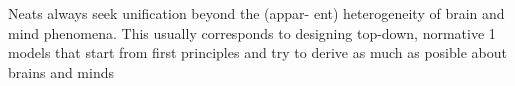  Neats always seek unification beyond the (appar-
ent) heterogeneity of brain and mind phenomena. This usually corresponds
to designing top-down, normative 1 models that start from first principles and
try to derive as much as posible about brains and minds \cite{active_inference_book}